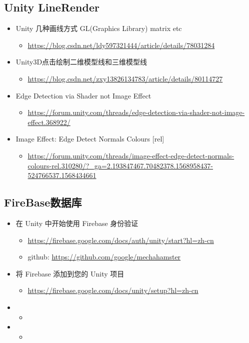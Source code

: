 \documentclass[9pt, b5paper]{article}
\begin{document}
\subsection{Unity LineRender}
\label{sec-2-3}
\begin{itemize}
\item Unity 几种画线方式 GL(Graphics Library) matrix etc
\begin{itemize}
\item \url{https://blog.csdn.net/ldy597321444/article/details/78031284}
\end{itemize}
\item Unity3D点击绘制二维模型线和三维模型线
\begin{itemize}
\item \url{https://blog.csdn.net/zxy13826134783/article/details/80114727}
\end{itemize}
\item Edge Detection via Shader not Image Effect
\begin{itemize}
\item \url{https://forum.unity.com/threads/edge-detection-via-shader-not-image-effect.368922/}
\end{itemize}
\item Image Effect: Edge Detect Normals Colours [rel]
\begin{itemize}
\item \url{https://forum.unity.com/threads/image-effect-edge-detect-normals-colours-rel.310280/?_ga=2.193847467.70482378.1568958437-524766537.1568434661}
\end{itemize}
\end{itemize}

\subsection{FireBase数据库}
\label{sec-2-4}
\begin{itemize}
\item 在 Unity 中开始使用 Firebase 身份验证
\begin{itemize}
\item \url{https://firebase.google.com/docs/auth/unity/start?hl=zh-cn}
\item github: \url{https://github.com/google/mechahamster}
\end{itemize}
\item 将 Firebase 添加到您的 Unity 项目
\begin{itemize}
\item \url{https://firebase.google.com/docs/unity/setup?hl=zh-cn}
\end{itemize}
\item \begin{itemize}
\item 
\end{itemize}
\item \begin{itemize}
\item 
\end{itemize}
\end{itemize}
\end{document}
